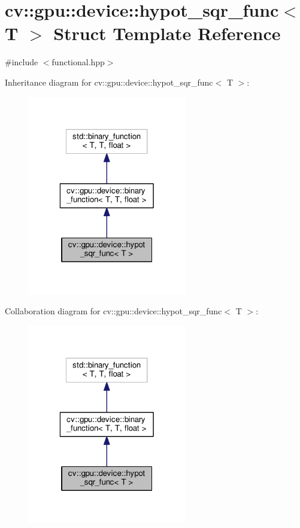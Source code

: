 \hypertarget{structcv_1_1gpu_1_1device_1_1hypot__sqr__func}{\section{cv\-:\-:gpu\-:\-:device\-:\-:hypot\-\_\-sqr\-\_\-func$<$ T $>$ Struct Template Reference}
\label{structcv_1_1gpu_1_1device_1_1hypot__sqr__func}
}


{\ttfamily \#include $<$functional.\-hpp$>$}



Inheritance diagram for cv\-:\-:gpu\-:\-:device\-:\-:hypot\-\_\-sqr\-\_\-func$<$ T $>$\-:\nopagebreak
\begin{figure}[H]
\begin{center}
\leavevmode
\includegraphics[width=196pt]{structcv_1_1gpu_1_1device_1_1hypot__sqr__func__inherit__graph}
\end{center}
\end{figure}


Collaboration diagram for cv\-:\-:gpu\-:\-:device\-:\-:hypot\-\_\-sqr\-\_\-func$<$ T $>$\-:\nopagebreak
\begin{figure}[H]
\begin{center}
\leavevmode
\includegraphics[width=196pt]{structcv_1_1gpu_1_1device_1_1hypot__sqr__func__coll__graph}
\end{center}
\end{figure}
